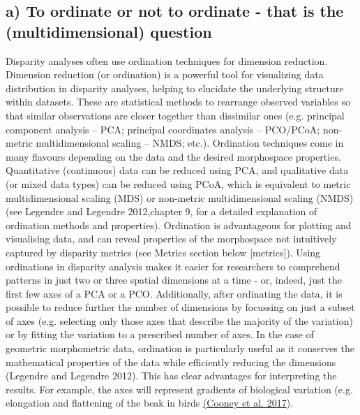 \subsection{a) To ordinate or not to ordinate - that is the (multidimensional) question}

Disparity analyses often use ordination techniques for dimension reduction.
Dimension reduction (or ordination) is a powerful tool for visualizing data distribution in disparity analyses, helping to elucidate the underlying structure within datasets.
These are statistical methods to rearrange observed variables so that similar observations are closer together than dissimilar ones (e.g. principal component analysis -- PCA; principal coordinates analysis -- PCO/PCoA; non-metric multidimensional scaling -- NMDS; etc.).
Ordination techniques come in many flavours depending on the data and the desired morphospace properties.
Quantitative (continuous) data can be reduced using PCA, and qualitative data (or mixed data types) can be reduced using PCoA, which is equivalent to metric multidimensional scaling (MDS) or non-metric multidimensional scaling (NMDS) (see Legendre and Legendre 2012,chapter 9, for a detailed explanation of ordination methods and properties).
Ordination is advantageous for plotting and visualising data, and can reveal properties of the morphospace not intuitively captured by disparity metrics (see Metrics section below {[}metrics{]}).
Using ordinations in disparity analysis makes it easier for researchers to comprehend patterns in just two or three spatial dimensions at a time - or, indeed, just the first few axes of a PCA or a PCO.
Additionally, after ordinating the data, it is possible to reduce further the number of dimensions by focussing on just a subset of axes (e.g. selecting only those axes that describe the majority of the variation) or by fitting the variation to a prescribed number of axes.
In the case of geometric morphometric data, ordination is particularly useful as it conserves the mathematical properties of the data while efficiently reducing the dimensions (Legendre and Legendre 2012). %
This has clear advantages for interpreting the results.
For example, the axes will represent gradients of biological variation (e.g. elongation and flattening of the beak in birds \href{https://paperpile.com/c/sTGYvp/RjqE}{(Cooney et al. 2017}).


